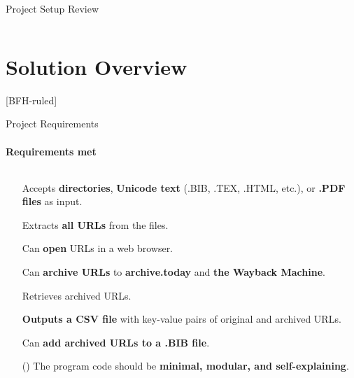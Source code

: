 \documentclass[
    ngerman,%
    authorontitle=true,
]{bfhbeamer}
\begin{document}
\begin{frame}{Project Setup Review}
\begin{columns}
\begin{column}{0.23\textwidth}
\begin{center}
	    		\end{center}
    		\end{column}
    	\end{columns}
    \end{frame}



	\section{Solution Overview}
	[BFH-ruled]
	\frame{\sectionpage}
	
	\begin{frame}{Project Requirements}
		\framesubtitle{Requirements met}
		\begin{columns} %
			\begin{column}{0.7\textwidth} %
				\begin{itemize}
					\item[\checkmark] Accepts \textbf{directories}, \textbf{Unicode text} (.BIB, .TEX, .HTML, etc.), or \textbf{.PDF files} as input.
					\item[\checkmark] Extracts \textbf{all URLs} from the files.
					\item[\checkmark] Can \textbf{open} URLs in a web browser.
					\item[\checkmark] Can \textbf{archive URLs} to \textbf{archive.today} and \textbf{the Wayback Machine}.
					\item[\checkmark] Retrieves archived URLs.
					\item[\checkmark] \textbf{Outputs a CSV file} with key-value pairs of original and archived URLs.
					\item[\checkmark] Can \textbf{add archived URLs to a .BIB file}.
					\item[(\checkmark)] The program code should be \textbf{minimal, modular, and self-explaining}.
				\end{itemize}
				

\end{column}
\end{columns}
\end{frame}
\end{document}
